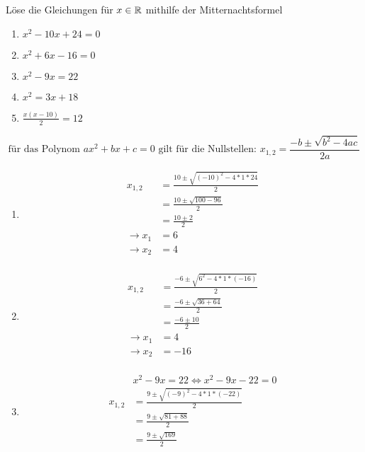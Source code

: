  Löse die Gleichungen für $x\in \mathbb{R}$ mithilfe der Mitternachtsformel
\begin{multicols}{3}
  \begin{enumerate}
    \item $x^2 - 10x + 24 = 0$
    \item $x^2 + 6x - 16 = 0$
    \item $x^2 - 9x = 22$
    \item $x^2 = 3x + 18$
    \item $\frac{x(x-10)}{2} = 12$
  \end{enumerate}
\end{multicols}

\begin{lsg}{}
  \begin{equation*}
    \text{für das Polynom $ax^2+bx+c=0$ gilt für die Nullstellen: } x_{1,2}=\frac{-b\pm\sqrt{b^2-4ac}}{2a}
  \end{equation*}
    \begin{enumerate}
      \item \begin{align*}
      x_{1,2}&=\frac{10\pm\sqrt{(-10)^2-4*1*24}}{2}\\
      &=\frac{10\pm\sqrt{100-96}}{2}\\
      &=\frac{10\pm2}{2}\\
      \rightarrow x_1&=6\\
      \rightarrow x_2&=4\\
      \end{align*}
      \item \begin{align*}
      x_{1,2}&=\frac{-6\pm\sqrt{6^2-4*1*(-16)}}{2}\\
      &=\frac{-6\pm\sqrt{36+64}}{2}\\
      &=\frac{-6\pm10}{2}\\
      \rightarrow x_1&=4\\
      \rightarrow x_2&=-16\\
      \end{align*}
      \item
      \begin{align*}
        &x^2 - 9x = 22 \Leftrightarrow x^2 - 9x - 22 = 0\\
        x_{1,2}&=\frac{9\pm\sqrt{(-9)^2-4*1*(-22)}}{2}\\
        &=\frac{9\pm\sqrt{81+88}}{2}\\
        &=\frac{9\pm\sqrt{169}}{2}\\

\end{align*}
\end{enumerate}
\end{lsg}
